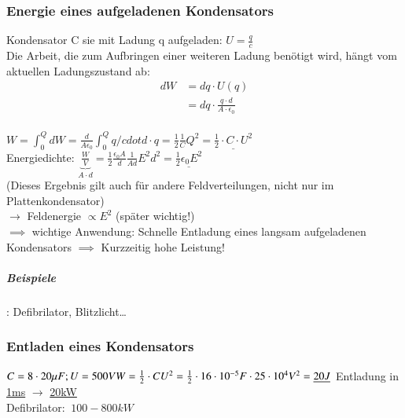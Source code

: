 \documentclass[11pt]{article}
\begin{document}
\subsubsection{Energie eines aufgeladenen Kondensators}

Kondensator C sie mit Ladung q aufgeladen: $U=\frac{q}{c}$\\
Die Arbeit, die zum Aufbringen einer weiteren Ladung benötigt wird, hängt vom aktuellen Ladungszustand ab:\\

\begin{align*}
	dW&=dq\cdot U(q)\\
	&=dq\cdot\frac{q\cdot d}{A\cdot \epsilon_0}
\end{align*}\\

$W=\int_0^Q dW= \frac{d}{A\epsilon_0}\int_0^Q q/cdot d\cdot q= \frac{1}{2}\frac{1}{C}Q^2=\underline{\frac{1}{2}\cdot C\cdot U^2} $\\

Energiedichte: $ \underbrace{\frac{W}{V}}_{A\cdot d}=\frac{1}{2}\frac{\epsilon_0A}{d}\frac{1}{Ad}E^2d^2=\underline{\frac{1}{2}\epsilon_0E^2}$\\

(Dieses Ergebnis gilt auch für andere Feldverteilungen, nicht nur im Plattenkondensator)\\
$\rightarrow$ Feldenergie $\propto E^2$ (später wichtig!)\\

$\implies$ wichtige Anwendung: Schnelle Entladung eines langsam aufgeladenen Kondensators $\implies$ Kurzzeitig hohe Leistung!\\
\subparagraph{Beispiele}: Defibrilator, Blitzlicht…\\

\subsubsection{Entladen eines Kondensators}
\begin{math}
C=8\cdot 20\mu F; U=500V\\ W=\frac{1}{2}\cdot CU^2=\frac{1}{2}\cdot 16\cdot 10^{-5}F\cdot 25\cdot 10^4V^2\\ =\underline{20J}\\
\end{math}
Entladung in \underline{1ms} $\rightarrow$ \underline{20kW}\\

Defibrilator: $~ 100 - 800 kW$\\
\end{document}
